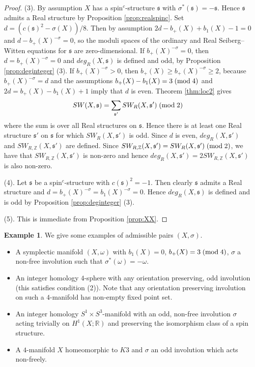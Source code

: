 \documentclass{amsart}
\theoremstyle{definition}
\newtheorem{example}[theorem]{Example}
\theoremstyle{remark}
\numberwithin{equation}{section}
\begin{document}
\begin{proof}
(3). By assumption $X$ has a spin$^c$-structure $\mathfrak{s}$ with $\sigma^*(\mathfrak{s}) = -\mathfrak{s}$. Hence $\mathfrak{s}$ admits a Real structure by Proposition \ref{prop:realspinc}. Set $d = (c(\mathfrak{s})^2 - \sigma(X))/8$. Then by assumption $2d - b_+(X) + b_1(X) - 1 = 0$ and $d - b_+(X)^{-\sigma} = 0$, so the moduli spaces of the ordinary and Real Seiberg--Witten equations for $\mathfrak{s}$ are zero-dimensional. If $b_+(X)^{-\sigma} = 0$, then $d = b_+(X)^{-\sigma} = 0$ and $deg_R(X,\mathfrak{s})$ is defined and odd, by Proposition \ref{prop:deginteger} (3). If $b_+(X)^{-\sigma} > 0$, then $b_+(X) \ge b_+(X)^{-\sigma} \ge 2$, because $b_+(X)^{-\sigma} = d$ and the assumptions $b_+(X) - b_1(X) = 3 \; ({\rm mod} \; 4)$ and $2d = b_+(X)-b_1(X)+1$ imply that $d$ is even. Theorem \ref{thm:loc2} gives
\[
SW(X,\mathfrak{s}) = \sum_{\mathfrak{s}'} SW_R(X,\mathfrak{s}') \; ({\rm mod} \; 2)
\]
where the sum is over all Real structures on $\mathfrak{s}$. Hence there is at least one Real structure $\mathfrak{s}'$ on $\mathfrak{s}$ for which $SW_R(X,\mathfrak{s}')$ is odd. Since $d$ is even, $deg_R(X,\mathfrak{s}')$ and $SW_{R,\mathbb{Z}}(X,\mathfrak{s}')$ are defined. Since $SW_{R,\mathbb{Z}}(X,\mathfrak{s}') = SW_R(X,\mathfrak{s}') \; ({\rm mod} \; 2)$, we have that $SW_{R,\mathbb{Z}}(X,\mathfrak{s}')$ is non-zero and hence $deg_R(X,\mathfrak{s}') = 2 SW_{R,\mathbb{Z}}(X,\mathfrak{s}')$ is also non-zero.

(4). Let $\mathfrak{s}$ be a spin$^c$-structure with $c(\mathfrak{s})^2 = -1$. Then clearly $\mathfrak{s}$ admits a Real structure and $d = b_+(X)^{-\sigma} = b_1(X)^{-\sigma} = 0$. Hence $deg_R(X,\mathfrak{s})$ is defined and is odd by Proposition \ref{prop:deginteger} (3).

(5). This is immediate from Proposition \ref{prop:XX}.
\end{proof}

\begin{example}
We give some examples of admissible pairs $(X,\sigma)$.
\begin{itemize}
\item[(1)]{A symplectic manifold $(X,\omega)$ with $b_1(X) = 0$, $b_+(X) = 3 \; ({\rm mod} \; 4)$, $\sigma$ a non-free involution such that $\sigma^*(\omega) = -\omega$.}
\item[(2)]{An integer homology $4$-sphere with any orientation preserving, odd involution (this satisfies condition (2)). Note that any orientation preserving involution on such a $4$-manifold has non-empty fixed point set.}
\item[(3)]{An integer homology $S^1 \times S^3$-manifold with an odd, non-free involution $\sigma$ acting trivially on $H^1(X;\mathbb{R})$ and preserving the isomorphism class of a spin structure.}
\item[(4)]{A $4$-manifold $X$ homeomorphic to $K3$ and $\sigma$ an odd involution which acts non-freely.}
\end{itemize}

\end{example}
\end{document}
